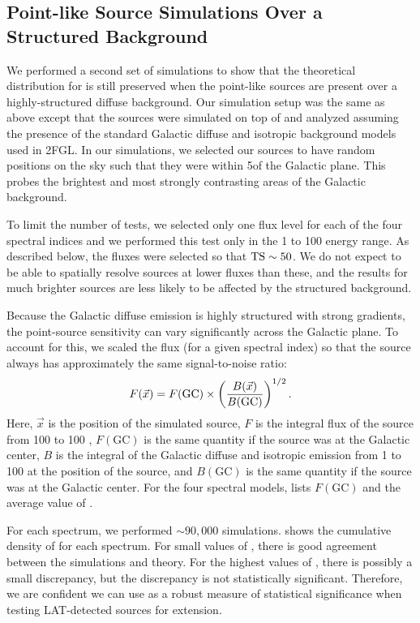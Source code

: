 \subsection{Point-like Source Simulations Over a Structured Background}

We performed a second set of simulations to show that the theoretical distribution
for \tsext is still preserved when the point-like sources are present over
a highly-structured diffuse background.
Our simulation setup was the same as above except that the sources were
simulated on top of and analyzed assuming the presence of the standard
Galactic diffuse and isotropic background models used in 2FGL.  In our
simulations, we selected our sources to have random positions on the sky
such that they were within 5\degree of the Galactic plane. This probes the 
brightest and most strongly contrasting areas of the Galactic background.

To limit the number of tests, we selected only one flux
level for each of the four spectral indices and we performed
this test only in the 1 \gev to 100 \gev energy range. 
As described below, the fluxes were selected so that $\mathrm{TS}\sim50$. We do not
expect to be able to spatially resolve sources 
at lower fluxes than these, and the results for much brighter sources
are less likely to be affected by the 
structured background.

Because the Galactic diffuse emission is highly structured with
strong gradients, the point-source
sensitivity can vary significantly across the Galactic plane.
To account for this, we scaled the flux (for a given spectral index)
so that the source always has approximately the same signal-to-noise ratio:
\begin{equation}
  \eqnlabel{scale_flux_by_background}
  F(\vec{x}) = F(\text{GC}) \times \left(
  \frac{B(\vec{x})}{B(\text{GC})}\right)^{1/2}.
\end{equation}
Here, $\vec{x}$ is the position of the simulated source, $F$ is the integral
flux of the source from 100 \mev to 100 \gev, $F(\text{GC})$
is the same quantity if the source was at the Galactic center, $B$
is the integral of the Galactic diffuse and isotropic emission
from 1 \gev to 100 \gev at the position of the source, and $B(\text{GC})$ is the same quantity
if the source was at the Galactic center.  For the four spectral models,
 lists $F(\text{GC})$ and the average value of \ts.

For each spectrum, we performed $\sim90,000$ simulations.
 shows the cumulative density
of \tsext for each spectrum. For small values of \tsext,
there is good agreement between the simulations and
theory.  For the highest values of \tsext, there is possibly
a small discrepancy, but the discrepancy is not statistically significant.
Therefore, we are confident we can use \tsext as a robust measure of
statistical significance when testing LAT-detected sources for extension.

